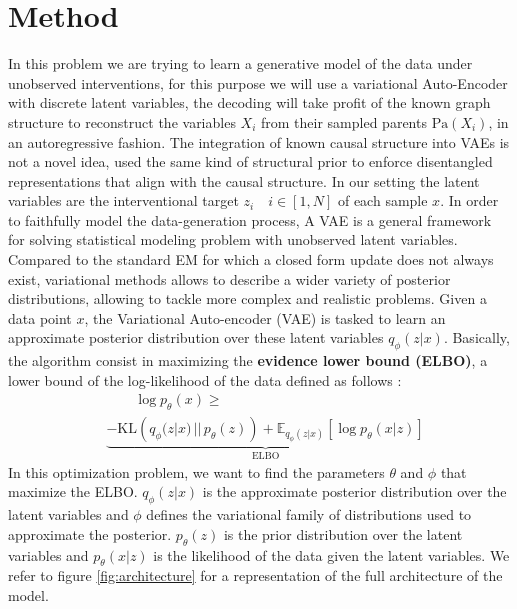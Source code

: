 \documentclass{article}
\begin{document}
\section{Method}\label{subsec:Method}
In this problem we are trying to learn a generative model of the data under
unobserved interventions, for this purpose we will use a variational
Auto-Encoder \citep{kingma2022autoencodingvariationalbayes} with discrete
latent variables, the decoding will take profit of the known graph structure to
reconstruct the variables $X_i$ from their sampled parents $\text{Pa}(X_i)$, in
an autoregressive fashion. The integration of known causal structure into VAEs
is not a novel idea, \citet{SCMVAE} used the same kind of structural prior to
enforce disentangled representations that align with the causal structure. In
our setting the latent variables are the interventional target $z_i \quad i \in
    [1,N]$ of each sample $x$. In order to faithfully model the data-generation
process, A VAE is a general framework for solving statistical modeling problem
with unobserved latent variables. Compared to the standard EM for which a
closed form update does not always exist, variational methods allows to
describe a wider variety of posterior distributions, allowing to tackle more
complex and realistic problems. Given a data point $x$, the Variational
Auto-encoder (VAE) is tasked to learn an approximate posterior distribution
over these latent variables $q_\phi(z | x)$. Basically, the algorithm consist
in maximizing the \textbf{evidence lower bound (ELBO)}, a lower bound of the
log-likelihood of the data defined as follows :
\begin{align*}
     & \quad\quad \log p_\theta(x) \geq                                                                                                                     \\
     & \underbrace{ - \text{KL}\left(q_\phi(z | x) \,||\, p_\theta(z)\right)+ \mathbb{E}_{q_\phi(z | x)} \left[ \log p_\theta(x | z) \right]}_{\text{ELBO}}
\end{align*}
In this optimization problem, we want to find the parameters $\theta$ and $\phi$ that maximize the ELBO. $q_\phi(z | x)$ is the approximate posterior distribution over the latent variables and $\phi$ defines the variational family of distributions used to approximate the posterior. $p_\theta(z)$ is the prior distribution over the latent variables and $p_\theta(x | z)$ is the likelihood of the data given the latent variables. We refer to figure \ref{fig:architecture} for a representation of the full architecture of the model.
\end{document}
